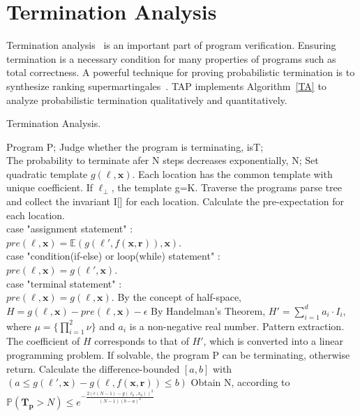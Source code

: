 \documentclass[sigconf,review, anonymous]{acmart}
\begin{document}
\section{Termination Analysis}
Termination analysis~\cite{Codish1999Semantic} is an important part of program verification. Ensuring termination is a necessary condition for many properties of programs such as total correctness. A powerful technique for proving probabilistic termination is to synthesize ranking supermartingales~\cite{Chakarov2013Martingales,Hermanns2013Probabilistic,cha2015algorithmic,kris2016termination}. TAP implements Algorithm~\ref{TA} to analyze probabilistic termination qualitatively and quantitatively. 
\begin{algorithm}[htb]  
	\caption{Termination Analysis.}  
	\label{TA}  
	\begin{algorithmic}[1]  
		\REQUIRE 
		Program P; 
		\ENSURE  
		Judge whether the program is terminating, isT;\\
		The probability to terminate afer N steps decreases exponentially, N;
		\STATE Set quadratic template $g(\ell,\boldsymbol{x})$. Each location has the common template with unique coefficient. If $\ell_{\bot}$, the template g=K.
		\STATE Traverse the programs parse tree and collect the invariant I[] for each location.
		\STATE Calculate the pre-expectation for each location.\\
		\quad \quad case "assignment statement" :\\
		\quad \quad \quad \quad $pre(\ell,\boldsymbol{x})= \mathbb{E}(g(\ell',f(\boldsymbol{x},\boldsymbol{r})),\boldsymbol{x})$.\\
		\quad \quad case "condition(if-else) or loop(while) statement" :\\
		\quad \quad \quad \quad $pre(\ell,\boldsymbol{x})=g(\ell',\boldsymbol{x})$.\\
		\quad \quad case "terminal statement" :\\
		\quad \quad \quad \quad $pre(\ell,\boldsymbol{x})=g(\ell,\boldsymbol{x}).$
		\STATE By the concept of half-space, $H=g(\ell,\boldsymbol{x})-pre(\ell,\boldsymbol{x})-\epsilon$
		\STATE By Handelman's Theorem, $H'=\sum\limits_{i=1}^{d} a_i\cdot I_i$, where $\mu=\{\prod\limits_{i=1}^{2}\nu\}$ and $a_i$ is a non-negative real number.
		\STATE Pattern extraction. The coefficient of $H$ corresponds to that of $H'$, which is converted into a linear programming problem. If solvable, the program P can be terminating, otherwise return.
		\STATE Calculate the difference-bounded $[a,b]$ with $(a\leq g(\ell',\boldsymbol{x})-g(\ell,f(\boldsymbol{x},\boldsymbol{r}))\leq b)$
		\STATE Obtain N, according to $\mathbb{P}(\bm{T_p} > N) \leq e^{-\frac{2(\epsilon(N-1)-g(\ell_0,x_0))^2}{(N-1)(b-a)^2}}$
	\end{algorithmic}  
\end{algorithm}  
\end{document}
